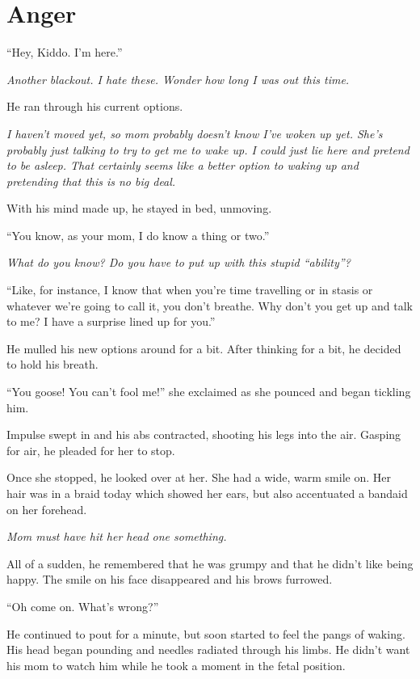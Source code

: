 \chapter*{Anger}


``Hey, Kiddo. I'm here.''

\textit{Another blackout. I hate these. Wonder how long I was out this time.}

He ran through his current options.

\textit{I haven't moved yet, so mom probably doesn't know I've woken up yet. She's probably just talking to try to get me to wake up. I could just lie here and pretend to be asleep. That certainly seems like a better option to waking up and pretending that this is no big deal.}

With his mind made up, he stayed in bed, unmoving.

``You know, as your mom, I do know a thing or two.''

\textit{What do you know? Do you have to put up with this stupid ``ability''?}

``Like, for instance, I know that when you're time travelling or in stasis or whatever we're going to call it, you don't breathe. Why don't you get up and talk to me? I have a surprise lined up for you.''

He mulled his new options around for a bit. After thinking for a bit, he decided to hold his breath.

``You goose! You can't fool me!'' she exclaimed as she pounced and began tickling him.

Impulse swept in and his abs contracted, shooting his legs into the air. Gasping for air, he pleaded for her to stop.

Once she stopped, he looked over at her. She had a wide, warm smile on. Her hair was in a braid today which showed her ears, but also accentuated a bandaid on her forehead.

\textit{Mom must have hit her head one something.}

All of a sudden, he remembered that he was grumpy and that he didn't like being happy. The smile on his face disappeared and his brows furrowed.

``Oh come on. What's wrong?''

He continued to pout for a minute, but soon started to feel the pangs of waking. His head began pounding and needles radiated through his limbs. He didn't want his mom to watch him while he took a moment in the fetal position.

